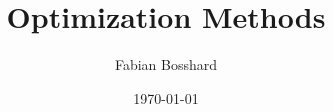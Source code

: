 \newcommand{\im}{\operatorname{Im}}

\newcommand{\matr}[1]{\underline{\boldsymbol{#1}}}
\newcommand{\vect}[1]{\vec{\boldsymbol{#1}}}




\newcommand{\dif}{\mathrm{d}}

\newcommand{\R}{\mathbb{R}}
\newcommand{\N}{\mathbb{N}}
\newcommand{\Z}{\mathbb{Z}}
\newcommand{\Q}{\mathbb{Q}}
\newcommand{\C}{\mathbb{C}}

\newcommand{\Var}{\operatorname{Var}}
\newcommand{\Cov}{\operatorname{Cov}}
\newcommand{\Exp}{\operatorname{E}}
\newcommand{\Prob}{\operatorname{P}}
\newcommand{\numof}{\ensuremath{\# \,}} %
\newcommand{\blackheight}{\operatorname{bh}}

\algnewcommand{\TO}{, \ldots ,}
\algnewcommand{\DOWNTO}{, \ldots ,}
\algnewcommand{\OR}{\vee}
\algnewcommand{\AND}{\wedge}
\algnewcommand{\NOT}{\neg}
\algnewcommand{\append}{\circ}


\newcommand{\attrib}[2]{\ensuremath{#1\mathtt{.}\mathtt{#2}}} %
\newcommand{\attribnormal}[2]{\ensuremath{#1\mathtt{.}#2}} 





\title{Optimization Methods}
\author{Fabian Bosshard}
\date{\today}



\usepackage[
  colorlinks=false,        %
  pdfborder={0 0 0}        %
]{hyperref}
\usepackage[
  type     = {CC},
  modifier = {by},
  version  = {4.0},
]{doclicense}
\usepackage{cleveref}





